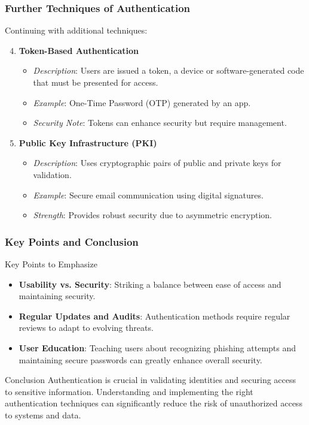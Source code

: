 \documentclass{beamer}
\begin{document}
\begin{frame}[fragile]
    \frametitle{Further Techniques of Authentication}
    Continuing with additional techniques:

    \begin{enumerate}
        \setcounter{enumi}{3} %
        \item \textbf{Token-Based Authentication} 
        \begin{itemize}
            \item \textit{Description}: Users are issued a token, a device or software-generated code that must be presented for access.
            \item \textit{Example}: One-Time Password (OTP) generated by an app.
            \item \textit{Security Note}: Tokens can enhance security but require management.
        \end{itemize}

        \item \textbf{Public Key Infrastructure (PKI)} 
        \begin{itemize}
            \item \textit{Description}: Uses cryptographic pairs of public and private keys for validation.
            \item \textit{Example}: Secure email communication using digital signatures.
            \item \textit{Strength}: Provides robust security due to asymmetric encryption.
        \end{itemize}
    \end{enumerate}
\end{frame}

\begin{frame}[fragile]
    \frametitle{Key Points and Conclusion}
    \begin{block}{Key Points to Emphasize}
        \begin{itemize}
            \item \textbf{Usability vs. Security}: Striking a balance between ease of access and maintaining security.
            \item \textbf{Regular Updates and Audits}: Authentication methods require regular reviews to adapt to evolving threats.
            \item \textbf{User Education}: Teaching users about recognizing phishing attempts and maintaining secure passwords can greatly enhance overall security.
        \end{itemize}
    \end{block}

    \begin{block}{Conclusion}
        Authentication is crucial in validating identities and securing access to sensitive information. Understanding and implementing the right authentication techniques can significantly reduce the risk of unauthorized access to systems and data.
    \end{block}
\end{frame}
\end{document}
